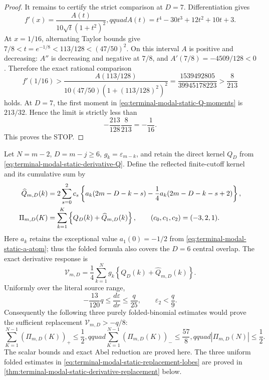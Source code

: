 \begin{proof}
It remains to certify the strict comparison at $D=7$.  Differentiation gives
\[
 f'(x)=\frac{A(t)}{10\sqrt t(1+t^2)^2},qquad
 A(t)=t^4-30t^3+12t^2+10t+3.
\]
At $x=1/16$, alternating Taylor bounds give
$7/8<t=e^{-1/8}<113/128<(47/50)^2$.  On this interval $A$ is positive and
decreasing: $A''$ is decreasing and negative at $7/8$, and
$A'(7/8)=-4509/128<0$.  Therefore the exact rational comparison
\[
 f'(1/16)>
 \frac{A(113/128)}{10(47/50)(1+(113/128)^2)^2}
 =\frac{1539492805}{39945178223}>\frac8{213}
\]
holds.  At $D=7$, the first moment in
\eqref{eq:terminal-modal-static-Q-moments} is $213/32$.  Hence the limit is
strictly less than
\[
 -\frac{213}{128}\frac8{213}=-\frac1{16}.
\]
This proves the STOP.
\end{proof}

\begin{lemma}
\label{lem:terminal-modal-static-derivative-replacement}
Let $N=m-2$, $D=m-j\ge6$, $g_k=\varepsilon_{m-k}$, and retain the direct
kernel $Q_D$ from \eqref{eq:terminal-modal-static-derivative-Q}.  Define the
reflected finite-cutoff kernel and its cumulative sum by
\begin{align}
 \widehat Q_{m,D}(k)
 &=2\sum_{s=0}^2c_s\left\{
 a_k(2m-D-k-s)-\frac14a_k(2m-D-k-s+2)\right\},\notag\\
 \Pi_{m,D}(K)&=\sum_{k=1}^K
 \left\{Q_D(k)+\widehat Q_{m,D}(k)\right\},
 \qquad(c_0,c_1,c_2)=(-3,2,1).
 \label{eq:terminal-modal-static-folded-derivative-prefix}
\end{align}
Here $a_k$ retains the exceptional value $a_1(0)=-1/2$ from
\eqref{eq:terminal-modal-static-a-atom}; thus the folded formula also covers
the $D=6$ central overlap.
The exact derivative response is
\begin{equation}
 \mathcal V_{m,D}=\frac14\sum_{k=1}^Ng_k
 \left\{Q_D(k)+\widehat Q_{m,D}(k)\right\}.
 \label{eq:terminal-modal-static-folded-derivative-response}
\end{equation}
Uniformly over the literal source range,
\begin{equation}
 -\frac{13}{120}q\le\frac{d\varepsilon}{dr}\le\frac q{25},
 \qquad \varepsilon_2<\frac q9.
 \label{eq:terminal-modal-static-epsilon-one-sided}
\end{equation}
Consequently the following three purely folded-binomial estimates would
prove the sufficient replacement $\mathcal V_{m,D}>-q/8$:
\begin{equation}
 \sum_{K=1}^{N-1}(\Pi_{m,D}(K))_+\le\frac12,qquad
 \sum_{K=1}^{N-1}(\Pi_{m,D}(K))_-\le\frac{57}{8},qquad
 |\Pi_{m,D}(N)|\le\frac12.
 \label{eq:terminal-modal-static-replacement-lobes}
\end{equation}
The scalar bounds and exact Abel reduction are proved here.  The three uniform
folded estimates in \eqref{eq:terminal-modal-static-replacement-lobes} are
proved in \cref{thm:terminal-modal-static-derivative-replacement} below.
\end{lemma}

